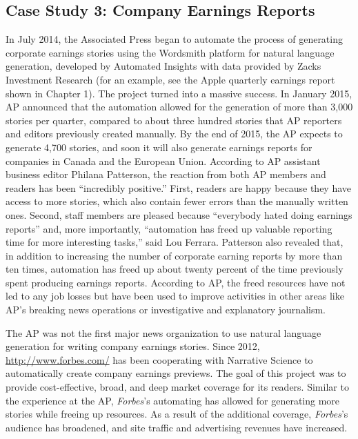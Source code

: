 \documentclass[notoc, symmetric, nobib, nols]{towcenter-guideto-book}
\begin{document}
\subsection{Case Study 3: Company Earnings Reports}
\begin{framed}
In July 2014, the Associated Press began to automate the process of generating corporate earnings stories using the Wordsmith platform for natural language generation, developed by Automated Insights with data provided by Zacks Investment Research (for an example, see the Apple quarterly earnings report shown in Chapter 1). The project turned into a massive success. In January 2015, AP announced that the automation allowed for the generation of more than 3,000 stories per quarter, compared to about three hundred stories that AP reporters and editors previously created manually. By the end of 2015, the AP expects to generate 4,700 stories, and soon it will also generate earnings reports for companies in Canada and the European Union. According to AP assistant business editor Philana Patterson, the reaction from both AP members and readers has been ``incredibly positive.''\autocite{white15} First, readers are happy because they have access to more stories, which also contain fewer errors than the manually written ones. Second, staff members are pleased because ``everybody hated doing earnings reports'' and, more importantly, ``automation has freed up valuable reporting time for more interesting tasks,'' said Lou Ferrara. Patterson also revealed that, in addition to increasing the number of corporate earning reports by more than ten times, automation has freed up about twenty percent of the time previously spent producing earnings reports. According to AP, the freed resources have not led to any job losses but have been used to improve activities in other areas like AP's breaking news operations or investigative and explanatory journalism.\autocite{white15}  

The AP was not the first major news organization to use natural language generation for writing company earnings stories. Since 2012, \href{Forbes.com}{http://www.forbes.com/} has been cooperating with Narrative Science to automatically create company earnings previews. The goal of this project was to provide cost-effective, broad, and deep market coverage for its readers. Similar to the experience at the AP, \textit{Forbes}'s automating has allowed for generating more stories while freeing up resources. As a result of the additional coverage, \textit{Forbes}'s audience has broadened, and site traffic and advertising revenues have increased.\autocite{ns13}
\end{framed}
\end{document}
